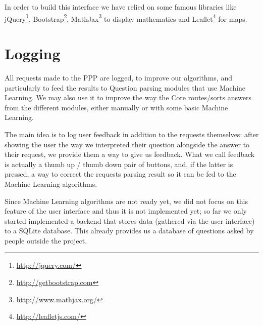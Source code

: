 In order to build this interface we have relied on some famous libraries 
like jQuery\footnote{\url{http://jquery.com/}}, Bootstrap\footnote{\url{http://getbootstrap.com}}, MathJax\footnote{\url{http://www.mathjax.org/}} to display mathematics and Leaflet\footnote{\url{http://leafletjs.com/}} for maps.

\section{Logging}

All requests made to the PPP are logged, to improve our algorithms,
and particularly to feed the results to Question parsing
modules that use Machine Learning.
We may also use it to improve the way the Core routes/sorts answers
from the different modules, either manually or with some basic
Machine Learning.

The main idea is to log user feedback in addition to the requests
themselves: after showing the user the way we interpreted their
question alongside the answer to their request, we provide them a
way to give us feedback.
What we call feedback is actually a thumb up / thumb down pair of
buttons, and, if the latter is pressed, a way to correct the requests
parsing result so it can be fed to the Machine Learning algorithms.

Since Machine Learning algorithms are not ready yet, we did not focus
on this feature of the user interface and thus it is not implemented yet;
so far we only started implemented a backend that stores data
(gathered via the user interface) to a SQLite database.
This already provides us a database of questions asked by people
outside the project.
